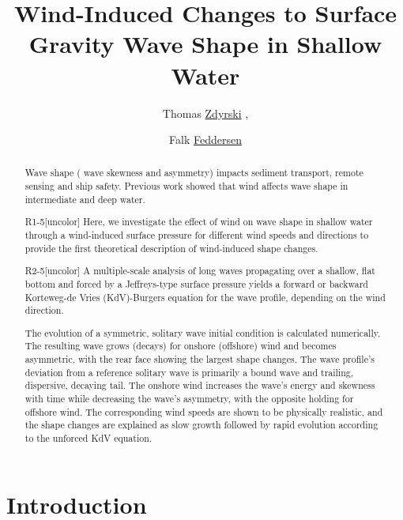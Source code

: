 \documentclass{jfm}
\title{Wind-Induced Changes to Surface Gravity Wave Shape in Shallow Water}
\author{Thomas \href{https://orcid.org/0000-0003-3039-172X}{Zdyrski}\aff{1}
  \corresp{\email{tzdyrski@uscd.edu}},
  \and Falk \href{https://orcid.org/0000-0002-5488-9074}{Feddersen}\aff{1}}
\affiliation{\aff{1}Scripps Institution of Oceanography, UCSD, La Jolla, CA 92092-0209, USA}
\begin{document}
\maketitle

\begin{abstract}
Wave shape (\eg{} wave skewness and asymmetry) impacts sediment
transport, remote sensing and ship safety.
Previous work showed that wind affects wave shape in intermediate and
deep water.
\begin{LineLabel}{R1-5}[uncolor]
Here, we investigate the effect of wind on wave shape in shallow water
through a wind-induced surface pressure for different wind speeds and
directions to provide the first theoretical description of wind-induced
shape changes.
\end{LineLabel}
\begin{LineLabel}{R2-5}[uncolor]
A multiple-scale analysis of long waves propagating over a shallow,
flat bottom and forced by a Jeffreys-type surface pressure yields a
forward or backward Korteweg-de Vries (KdV)-Burgers equation for the
wave profile, depending on the wind direction.
\end{LineLabel}
The evolution of a symmetric, solitary wave initial condition is
calculated numerically.
The resulting wave grows (decays) for onshore (offshore) wind and
becomes asymmetric, with the rear face showing the largest shape
changes.
The wave profile's deviation from a reference solitary wave is primarily
a bound wave and trailing, dispersive, decaying tail.
The onshore wind increases the wave's energy and skewness with time
while decreasing the wave's asymmetry, with the opposite holding for
offshore wind.
The corresponding wind speeds are shown to be physically realistic, and
the shape changes are explained as slow growth followed by rapid
evolution according to the unforced KdV equation.
\end{abstract}

\section{\label{sec:introduction} Introduction}
\end{document}
